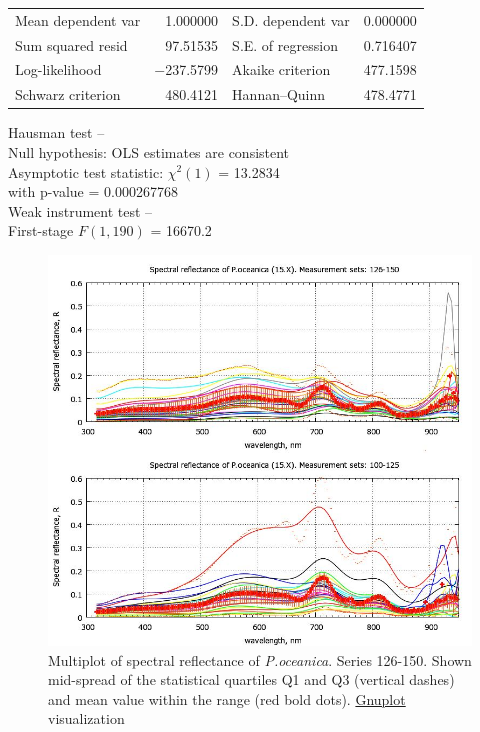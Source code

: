 \documentclass[10pt, a4paper]{article}
\begin{document}
\begin{appendices}
\begin{table}[htbp]
\begin{center}
	\vspace{1ex}
	\begin{tabular}{lrlr}
		Mean dependent var &  1.000000 & S.D. dependent var &  0.000000 \\
		Sum squared resid &  97.51535 & S.E. of regression &  0.716407 \\
		Log-likelihood & $-$237.5799 & Akaike criterion &  477.1598 \\
		Schwarz criterion &  480.4121 & Hannan--Quinn &  478.4771 \\
	\end{tabular}

	\vspace{1em}
	\begin{raggedright}
		Hausman test --\\
		\quad Null hypothesis: OLS estimates are consistent\\
		\quad Asymptotic test statistic: $\chi^2(1)$ = 13.2834\\
		\quad with p-value = 0.000267768\\
	\vspace{1ex}
		Weak instrument test -- \\
		\quad First-stage $F(1, 190)$ = 16670.2 \\
	\end{raggedright}

	\end{center}
	\label{tab:18}
\end{table}

\begin{figure}[H]
	\begin{center}
		\includegraphics[scale=0.4]{GNU-14.jpg}
		\caption{Multiplot of spectral reflectance of \textit{P.oceanica}. Series 126-150. Shown mid-spread of the statistical quartiles Q1 and Q3 (vertical dashes) and mean value within the range (red bold dots). \href{http://www.gnuplot.info/}{Gnuplot} visualization­}
		\label{fig:A.27}
	\end{center}
\end{figure}


\end{appendices}
\end{document}
